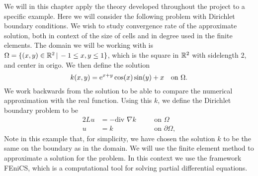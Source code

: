
We will in this chapter apply the theory developed throughout the project to a specific example. 
Here we will consider the following problem with Dirichlet boundary conditions.
We wish to study convergence rate of the approximate solution, 
both in context of the size of cells and in degree used in the 
finite elements. 
The domain we will be working with is $\Omega = \{ (x,y)\in \mathbb{R}^2 \,|\, -1 \leq x,y \leq 1\}$, 
which is the square in $\mathbb{R}^2$ with sidelength $2$, and center in origo.
We then define the solution 
\begin{equation}
    k(x,y) = \text{e}^{x+y}\cos(x)\sin(y)+x  \quad\text{on }\Omega. \label{eq:app_dirichlet}
\end{equation}
We work backwards from the solution to be able to compare the numerical approximation 
with the real function. Using this $k$, we define the Dirichlet boundary problem to be
\begin{alignat}{2}
    Lu &= -\text{div }\nabla k \quad && \text{on } \Omega \\
    u &= k \quad && \text{on } \partial \Omega, \nonumber
\end{alignat}
Note in this example that, for simplicity, we have chosen the solution $k$ to be the same on the boundary as in the domain.
We will use the finite element method to approximate a solution for the problem. In this context we use the framework FEniCS,
which is a computational tool for solving partial differential equations. 